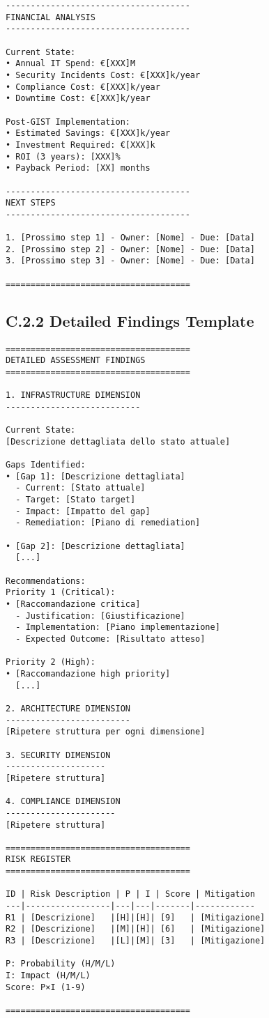 \begin{verbatim}
-------------------------------------
FINANCIAL ANALYSIS
-------------------------------------

Current State:
• Annual IT Spend: €[XXX]M
• Security Incidents Cost: €[XXX]k/year
• Compliance Cost: €[XXX]k/year
• Downtime Cost: €[XXX]k/year

Post-GIST Implementation:
• Estimated Savings: €[XXX]k/year
• Investment Required: €[XXX]k
• ROI (3 years): [XXX]%
• Payback Period: [XX] months

-------------------------------------
NEXT STEPS
-------------------------------------

1. [Prossimo step 1] - Owner: [Nome] - Due: [Data]
2. [Prossimo step 2] - Owner: [Nome] - Due: [Data]
3. [Prossimo step 3] - Owner: [Nome] - Due: [Data]

=====================================
\end{verbatim}

\subsection{C.2.2 Detailed Findings Template}

\begin{verbatim}
=====================================
DETAILED ASSESSMENT FINDINGS
=====================================

1. INFRASTRUCTURE DIMENSION
---------------------------

Current State:
[Descrizione dettagliata dello stato attuale]

Gaps Identified:
• [Gap 1]: [Descrizione dettagliata]
  - Current: [Stato attuale]
  - Target: [Stato target]
  - Impact: [Impatto del gap]
  - Remediation: [Piano di remediation]

• [Gap 2]: [Descrizione dettagliata]
  [...]

Recommendations:
Priority 1 (Critical):
• [Raccomandazione critica]
  - Justification: [Giustificazione]
  - Implementation: [Piano implementazione]
  - Expected Outcome: [Risultato atteso]

Priority 2 (High):
• [Raccomandazione high priority]
  [...]

2. ARCHITECTURE DIMENSION
-------------------------
[Ripetere struttura per ogni dimensione]

3. SECURITY DIMENSION
--------------------
[Ripetere struttura]

4. COMPLIANCE DIMENSION
----------------------
[Ripetere struttura]

=====================================
RISK REGISTER
=====================================

ID | Risk Description | P | I | Score | Mitigation
---|-----------------|---|---|-------|------------
R1 | [Descrizione]   |[H]|[H]| [9]   | [Mitigazione]
R2 | [Descrizione]   |[M]|[H]| [6]   | [Mitigazione]
R3 | [Descrizione]   |[L]|[M]| [3]   | [Mitigazione]

P: Probability (H/M/L)
I: Impact (H/M/L)
Score: P×I (1-9)

=====================================
\end{verbatim}

